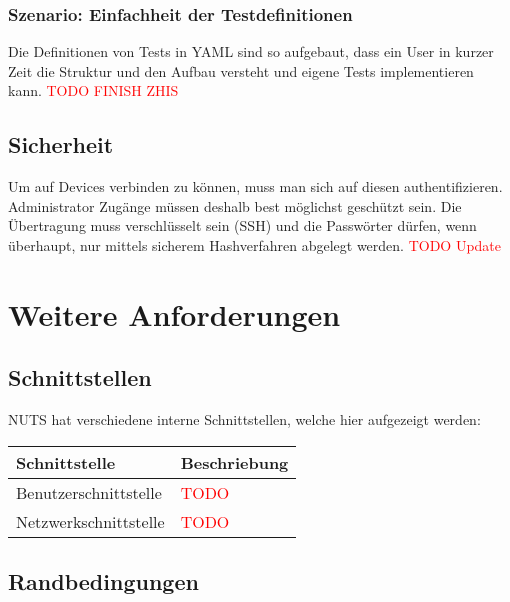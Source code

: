 \documentclass[
	ngerman,
	toc=listof, %
	toc=bibliography, %
	footnotes=multiple, %
	parskip=half, %
	numbers=noendperiod %
]{scrartcl}
\begin{document}
		\subsubsection{Szenario: Einfachheit der Testdefinitionen}
			Die Definitionen von Tests in YAML sind so aufgebaut, dass ein User in kurzer Zeit die Struktur und den Aufbau versteht und eigene Tests implementieren kann.
			\textcolor{red}{TODO FINISH ZHIS}


	\subsection{Sicherheit}
	Um auf Devices verbinden zu können, muss man sich auf diesen authentifizieren. Administrator Zugänge müssen deshalb best möglichst geschützt sein. Die Übertragung
	muss verschlüsselt sein (SSH) und die Passwörter dürfen, wenn überhaupt, nur mittels
	sicherem Hashverfahren abgelegt werden. \textcolor{red}{TODO Update}

\section{Weitere Anforderungen}
	\subsection{Schnittstellen}
		NUTS hat verschiedene interne Schnittstellen, welche hier aufgezeigt werden: \\
		\begin{tabularx}{\textwidth}{lX}
			\toprule
			Schnittstelle & Beschriebung \\
			\midrule
			Benutzerschnittstelle & \textcolor{red}{TODO} \\
			Netzwerkschnittstelle & \textcolor{red}{TODO} \\
			\bottomrule
		\end{tabularx}

	\subsection {Randbedingungen}
\end{document}
